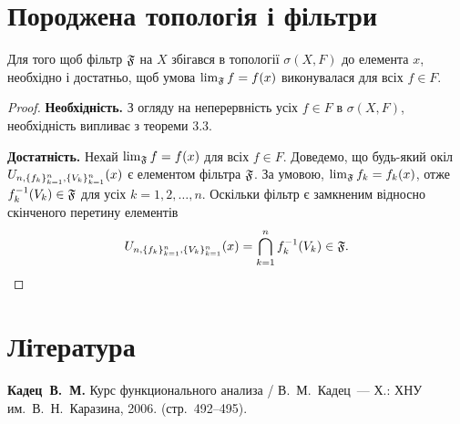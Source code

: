 \section{Породжена топологія і фільтри}

\begin{theorem}
    Для того щоб фільтр $\frak F$ на $X$ збігався в топології $\sigma(X, F)$ до елемента $x$, необхідно і достатньо, щоб умова $\lim_{\frak F} f = f(x)$ виконувалася для всіх $f \in F$.
\end{theorem}
\begin{proof}
    \textbf{Необхідність.} З огляду на неперервність усіх $f \in F$ в $\sigma(X, F)$, необхідність випливає з теореми 3.3.

    \textbf{Достатність.} Нехай $\lim_{\frak F} f = f(x)$ для всіх $f \in F$. Доведемо, що будь-який окіл $\InducedNeighbourhood{x}$ є елементом фільтра $\frak F$. За умовою, $\lim_{\frak F} f_k = f_k(x)$, отже $f_k\inv(V_k) \in \frak F$ для усіх $k = 1, 2, \dots, n$. Оскільки фільтр є замкненим відносно скінченого перетину елементів
    \begin{equation*}
        \InducedNeighbourhood{x} = \Bigcap_{k = 1}^n f_k\inv(V_k) \in \frak F. \qedhere
    \end{equation*}
\end{proof}

\section{Література}

\begin{enumerate}[label={[\arabic*]}]
\item \textbf{Кадец~В.~М.}
Курс функционального анализа /
В.~М.~Кадец~---
Х.: ХНУ им.~В.~Н.~Каразина, 2006. (стр.~492--495).
\end{enumerate}
